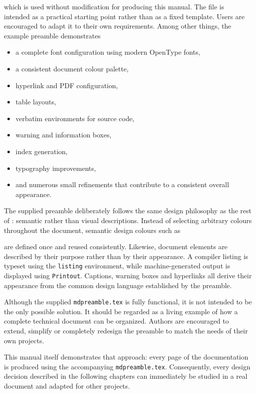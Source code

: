 \documentclass[
11pt,
a4paper,
oneside
]{scrbook}
\begin{document}
which is used without modification for producing this manual.
The file is intended as a practical starting point rather than as a fixed
template. Users are encouraged to adapt it to their own requirements.
Among other things, the example preamble demonstrates
\begin{itemize}
	\item a complete font configuration using modern OpenType fonts,
	\item a consistent document colour palette,
	\item hyperlink and PDF configuration,
	\item table layouts,
	\item verbatim environments for source code,
	\item warning and information boxes,
	\item index generation,
	\item typography improvements,
	\item and numerous small refinements that contribute to a consistent
	overall appearance.
\end{itemize}
The supplied preamble deliberately follows the same design philosophy as
the rest of \MDWordmark: semantic rather than visual descriptions.
Instead of selecting arbitrary colours throughout the document, semantic
design colours such as




are defined once and reused consistently.
Likewise, document elements are described by their purpose rather than by
their appearance. A compiler listing is typeset using the
\texttt{listing} environment, while machine-generated output is displayed
using \texttt{Printout}. Captions, warning boxes and hyperlinks all
derive their appearance from the common design language established by
the preamble.

Although the supplied \texttt{mdpreamble.tex} is fully functional, it is
not intended to be the only possible solution. It should be regarded as a
living example of how a complete technical document can be organized.
Authors are encouraged to extend, simplify or completely redesign the
preamble to match the needs of their own projects.

This manual itself demonstrates that approach: every page of the
documentation is produced using the accompanying
\texttt{mdpreamble.tex}. Consequently, every design decision described in
the following chapters can immediately be studied in a real document and
adapted for other projects.
 
\end{document}

